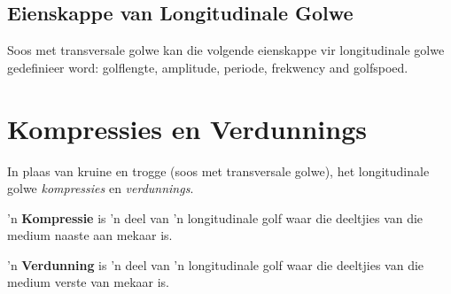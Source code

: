             \subsection*{Eienskappe van Longitudinale Golwe}
            \nopagebreak
      \label{m38782*id292291}Soos met transversale golwe kan die volgende eienskappe vir longitudinale golwe gedefinieer word:
golflengte, amplitude, periode, frekwency and golfspoed. 
      \label{m38782*uid6}
            \section{Kompressies en Verdunnings}
            \nopagebreak
In plaas van kruine en trogge (soos met transversale golwe), het longitudinale golwe \textsl{kompressies} en \textsl{verdunnings}.\par

 { \label{m38782*meaningfhsst!!!underscore!!!id105}
      'n \textbf{Kompressie} is 'n deel van 'n longitudinale golf waar die deeltjies van die medium naaste aan mekaar is.
       } 
\par
{} { \label{m38782*meaningfhsst!!!underscore!!!id108}
      'n \textbf{Verdunning} is 'n deel van 'n longitudinale golf waar die deeltjies van die medium verste van mekaar is.
       } 


